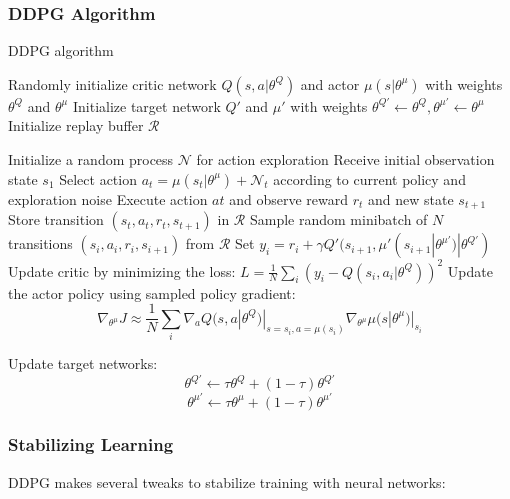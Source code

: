 \documentclass{article}
\begin{document}
\subsubsection{DDPG Algorithm}
\begin{algorithm}
\caption{DDPG algorithm}
\begin{algorithmic}[h!]
\State Randomly initialize critic network $Q(s,a|\theta^{Q})$ and actor $\mu(s|\theta^{\mu})$ with weights $\theta^{Q}$ and $\theta^{\mu}$
\State Initialize target network $Q'$ and $\mu'$ with weights $\theta^{Q'} \gets \theta^{Q}, \theta^{\mu'} \gets \theta^{\mu}$
\State Initialize replay buffer $\mathcal{R}$

\State Initialize a random process $\mathcal{N}$ for action exploration
\State Receive initial observation state $s_{1}$
\State Select action $a_{t} = \mu(s_{t}|\theta^{\mu}) + \mathcal{N}_{t}$ according to current policy and exploration noise
\State Execute action $a{t}$ and observe reward $r_{t}$ and new state $s_{t+1}$
\State Store transition $(s_{t}, a_{t}, r_{t}, s_{t+1})$ in $\mathcal{R}$
\State Sample random minibatch of $N$ transitions $(s_{i}, a_{i}, r_{i}, s_{i+1})$ from $\mathcal{R}$
\State Set $y_{i} = r_{i} + \gamma Q'(s_{i+1}, \mu'(s_{i+1}|\theta^{\mu'})|\theta^{Q'})$
\State Update critic by minimizing the loss: $L = \frac{1}{N}\sum_{i}(y_{i} - Q(s_{i}, a_{i}|\theta^{Q}))^2$
\State Update the actor policy using sampled policy gradient: $$\nabla_{\theta^{\mu}} J \approx \frac{1}{N}\sum_{i} \nabla_{a}Q(s, a|\theta^{Q})|_{{s=s_{i},a=\mu(s_{i})}} \nabla_{\theta^{\mu}} \mu(s|\theta^{\mu})|_{s_{i}}$$

\State Update target networks:
$$\theta^{Q'} \gets \tau \theta^{Q} + (1 - \tau)\theta^{Q'}$$
$$\theta^{\mu'} \gets \tau \theta^{\mu} + (1 - \tau)\theta^{\mu'}$$
\EndFor
\EndFor
\end{algorithmic}
\end{algorithm}

\subsubsection{Stabilizing Learning}
DDPG makes several tweaks to stabilize training with neural networks:
\end{document}
